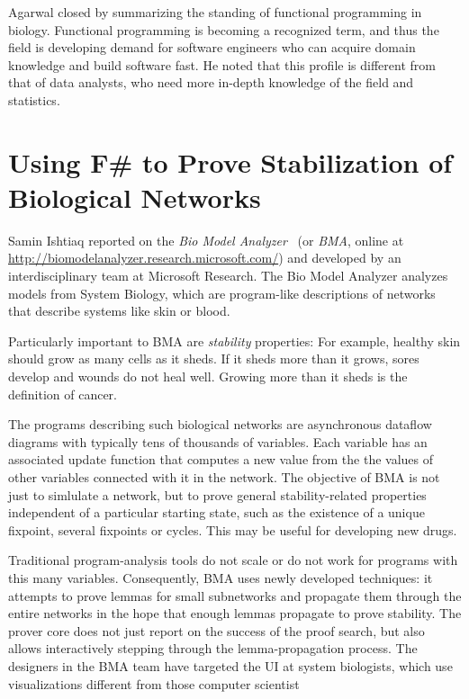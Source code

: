 \documentclass{jfp1}
\begin{document}
Agarwal closed by summarizing the standing of functional programming
in biology. Functional programming is becoming a recognized term, and
thus the field is developing demand for software engineers who can
acquire domain knowledge and build software fast.  He noted that this
profile is different from that of data analysts, who need more
in-depth knowledge of the field and statistics.

\section{Using F\# to Prove Stabilization of Biological Networks}

Samin Ishtiaq reported on the \textit{Bio Model
  Analyzer}~\cite{Benque:2012:BVT:2362216.2362280} (or \textit{BMA},
online at \url{http://biomodelanalyzer.research.microsoft.com/}) and
developed by an interdisciplinary team at Microsoft Research. The Bio
Model Analyzer analyzes models from System Biology, which are
program-like descriptions of networks that describe systems like skin
or blood.

Particularly important to BMA are \textit{stability} properties: For
example, healthy skin should grow as many cells as it sheds.  If it
sheds more than it grows, sores develop and wounds do not heal well.
Growing more than it sheds is the definition of cancer.

The programs describing such biological networks are asynchronous
dataflow diagrams with typically tens of thousands of variables.  Each
variable has an associated update function that computes a new value
from the the values of other variables connected with it in the
network.  The objective of BMA is not just to simlulate a network, but
to prove general stability-related properties independent of a
particular starting state, such as the existence of a unique fixpoint,
several fixpoints or cycles.  This may be useful for developing new
drugs.

Traditional program-analysis tools do not scale or do not work for
programs with this many variables.  Consequently, BMA uses newly
developed techniques: it attempts to prove lemmas for small
subnetworks and propagate them through the entire networks in the hope
that enough lemmas propagate to prove stability.  The prover core does
not just report on the success of the proof search, but also allows
interactively stepping through the lemma-propagation process.  The
designers in the BMA team have targeted the UI at system biologists,
which use visualizations different from those computer scientist
\end{document}
